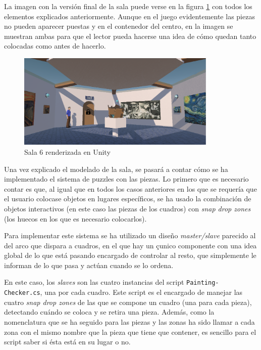 La imagen con la versión final de la sala puede verse en la figura \ref{fig:unity-sala-6} con todos los elementos explicados anteriormente. Aunque en el juego evidentemente las piezas no pueden aparecer puestas y en el contenedor del centro, en la imagen se muestran ambas para que el lector pueda hacerse una idea de cómo quedan tanto colocadas como antes de hacerlo.

\begin{figure}[!h]
\begin{center}
\includegraphics[width=0.85\textwidth]{imagenes/7/salas-unity/unity-sala-6.png}
\caption{Sala 6 renderizada en Unity}
\label{fig:unity-sala-6}
\end{center}
\end{figure}

Una vez explicado el modelado de la sala, se pasará a contar cómo se ha implementado el sistema de puzzles con las piezas. Lo primero que es necesario contar es que, al igual que en todos los casos anteriores en los que se requería que el usuario colocase objetos en lugares específicos, se ha usado la combinación de objetos interactivos (en este caso las piezas de los cuadros) con \textit{snap drop zones} (los huecos en los que es necesario colocarlos).

Para implementar este sistema se ha utilizado un diseño \textit{master/slave} parecido al del arco que dispara a cuadros, en el que hay un çunico componente con una idea global de lo que está pasando encargado de controlar al resto, que simplemente le informan de lo que pasa y actúan cuando se lo ordena.

En este caso, los \textit{slaves} son las cuatro instancias del script \texttt{Painting-} \texttt{Checker.cs}, una por cada cuadro. Este script es el encargado de manejar las cuatro \textit{snap drop zones} de las que se compone un cuadro (una para cada pieza), detectando cuándo se coloca y se retira una pieza. Además, como la nomenclatura que se ha seguido para las piezas y las zonas ha sido llamar a cada zona con el mismo nombre que la pieza que tiene que contener, es sencillo para el script saber si ésta está en su lugar o no.

